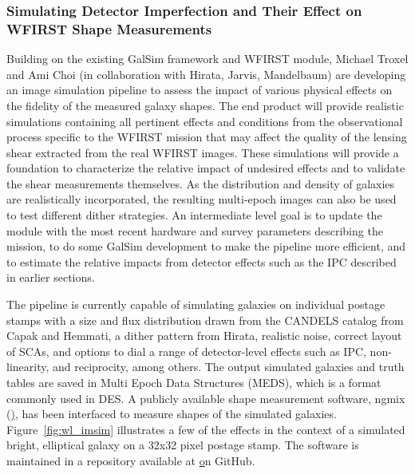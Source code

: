 \subsubsection{Simulating Detector Imperfection and Their Effect on WFIRST Shape Measurements}
\label{sec:hlis_image_sim}
Building on the existing GalSim framework and WFIRST module, Michael Troxel and Ami Choi (in collaboration with Hirata, Jarvis, Mandelbaum) are developing an image
simulation pipeline to assess the impact of various physical effects on the fidelity of the measured galaxy shapes.  The end product will provide realistic simulations containing all pertinent effects and conditions from the observational process specific to the WFIRST mission that may affect the quality of the lensing shear extracted
from the real WFIRST images.  These simulations will provide a foundation to characterize the relative impact of undesired effects and to validate the shear measurements themselves.  As the distribution and density of galaxies are realistically incorporated, the resulting multi-epoch images can also be used to test different dither strategies.  An intermediate level goal is to update the module with the most recent hardware and survey parameters describing the mission, to do some GalSim development to make the pipeline more efficient, and to estimate the relative impacts from detector effects such as the IPC described in earlier sections.

The pipeline is currently capable of simulating galaxies on individual postage stamps with a size and flux distribution drawn from the CANDELS catalog from Capak and Hemmati, a dither pattern from Hirata, realistic noise, correct layout of SCAs, and options to dial a range of detector-level effects such as IPC, non-linearity, and reciprocity, among others.  The output simulated galaxies and truth tables are saved in Multi Epoch Data Structures (MEDS), which is a format commonly used in DES.  A publicly available shape measurement software, ngmix (\href{https://github.com/esheldon/ngmix/}), has been interfaced to measure shapes of the simulated galaxies.  Figure~\ref{fig:wl_imsim} illustrates a few of the effects in the context of a simulated bright, elliptical galaxy on a 32x32 pixel postage stamp.  The software is maintained in a repository available at \href{https://github.com/matroxel/wfirst_imsim} on GitHub.

